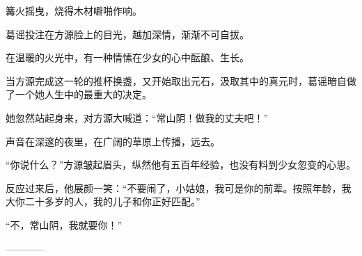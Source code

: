 \begin{this_body}
篝火摇曳，烧得木材噼啪作响。

葛谣投注在方源脸上的目光，越加深情，渐渐不可自拔。

在温暖的火光中，有一种情愫在少女的心中酝酿、生长。

当方源完成这一轮的推杯换盏，又开始取出元石，汲取其中的真元时，葛谣暗自做了一个她人生中的最重大的决定。

她忽然站起身来，对方源大喊道：“常山阴！做我的丈夫吧！”

声音在深邃的夜里，在广阔的草原上传播，远去。

“你说什么？”方源皱起眉头，纵然他有五百年经验，也没有料到少女忽变的心思。

反应过来后，他展颜一笑：“不要闹了，小姑娘，我可是你的前辈。按照年龄，我大你二十多岁的人，我的儿子和你正好匹配。”

“不，常山阴，我就要你！”

------------

\end{this_body}


